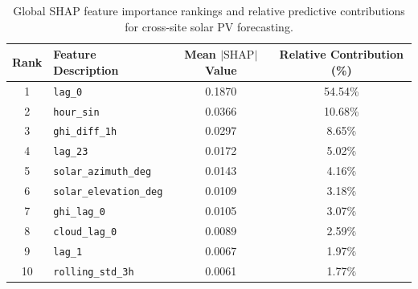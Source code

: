 \begin{table}[htbp]
\centering
\caption{Global SHAP feature importance rankings and relative predictive contributions for cross-site solar PV forecasting.}
\label{tab:feature_importance}
\begin{tabular}{clcc}
\hline
\textbf{Rank} & \textbf{Feature Description} & \textbf{Mean $|\text{SHAP}|$ Value} & \textbf{Relative Contribution (\%)} \\
\hline
1 & \texttt{lag_0} & 0.1870 & 54.54\% \\
2 & \texttt{hour_sin} & 0.0366 & 10.68\% \\
3 & \texttt{ghi_diff_1h} & 0.0297 & 8.65\% \\
4 & \texttt{lag_23} & 0.0172 & 5.02\% \\
5 & \texttt{solar_azimuth_deg} & 0.0143 & 4.16\% \\
6 & \texttt{solar_elevation_deg} & 0.0109 & 3.18\% \\
7 & \texttt{ghi_lag_0} & 0.0105 & 3.07\% \\
8 & \texttt{cloud_lag_0} & 0.0089 & 2.59\% \\
9 & \texttt{lag_1} & 0.0067 & 1.97\% \\
10 & \texttt{rolling_std_3h} & 0.0061 & 1.77\% \\
\hline
\end{tabular}
\end{table}
